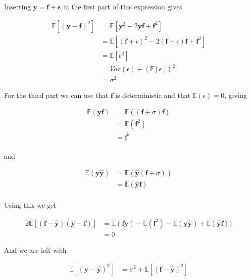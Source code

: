 \documentclass[11pt]{article}
\begin{document}
    Inserting \(\boldsymbol{y}=\boldsymbol{f}+\boldsymbol{\epsilon}\) in the
first part of this expression gives

    \[
\begin{aligned}
\mathbb{E}\left[(\boldsymbol{y}-\boldsymbol{f})^2 \right] &= \mathbb{E}\left[\boldsymbol{y}^2-2\boldsymbol{y}\boldsymbol{f}+\boldsymbol{f}^2\right]\\
&= \mathbb{E}\left[(\boldsymbol{f}+\epsilon)^2-2(\boldsymbol{f}+\epsilon)\boldsymbol{f}+\boldsymbol{f}^2\right]\\
&=\mathbb{E}\left[\epsilon^2\right]\\
&=Var(\epsilon) + (\mathbb{E}\left[\epsilon\right])^2 \\
&=\sigma^2
\end{aligned}
\]

    For the third part we can use that \(\boldsymbol{f}\) is deterministic
and that \(\mathbb{E}(\epsilon)=0\), giving

\[
\begin{aligned}
\mathbb{E}(\boldsymbol{y}\boldsymbol{f})&=\mathbb{E}((\boldsymbol{f}+\sigma)\boldsymbol{f})\\
&= \mathbb{E}(\boldsymbol{f}^2)\\
&= \boldsymbol{f}^2\\
\end{aligned}
\]

and

\[
\begin{aligned}
\mathbb{E}(\boldsymbol{y}\boldsymbol{\hat{y}})&=\mathbb{E}(\boldsymbol{\hat{y}}(\boldsymbol{f}+\sigma))\\
&= \mathbb{E}(\boldsymbol{\hat{y}}\boldsymbol{f})\\
\end{aligned}
\]

    Using this we get

\[
\begin{aligned}
2\mathbb{E}[(\boldsymbol{f}-\boldsymbol{\hat{y}})(\boldsymbol{y}-\boldsymbol{f})] &= \mathbb{E}(\boldsymbol{f}\boldsymbol{y})-\mathbb{E}(\boldsymbol{f}^2)-\mathbb{E}(\boldsymbol{y}\boldsymbol{\hat{y}})+\mathbb{E}(\boldsymbol{\hat{y}}\boldsymbol{f}))\\
&= 0
\end{aligned}
\]

    And we are left with

\[
\begin{aligned}
\mathbb{E}\left[(\boldsymbol{y}-\boldsymbol{\hat{y}})^2\right] &= \sigma^2 + \mathbb{E}[(\boldsymbol{f}-\boldsymbol{\hat{y}})^2]
\end{aligned}
\]
\end{document}
